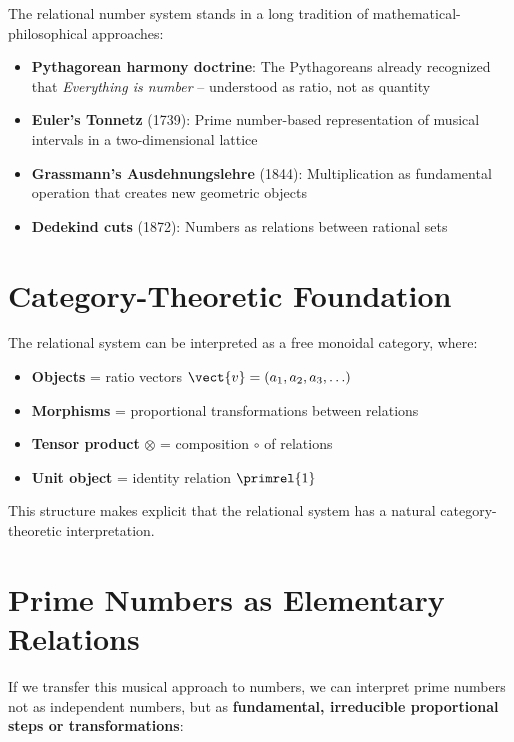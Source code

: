 	The relational number system stands in a long tradition of mathematical-philosophical approaches:
	
	\begin{itemize}
		\item \textbf{Pythagorean harmony doctrine}: The Pythagoreans already recognized that \emph{Everything is number} -- understood as ratio, not as quantity
		\item \textbf{Euler's Tonnetz} (1739): Prime number-based representation of musical intervals in a two-dimensional lattice
		\item \textbf{Grassmann's Ausdehnungslehre} (1844): Multiplication as fundamental operation that creates new geometric objects
		\item \textbf{Dedekind cuts} (1872): Numbers as relations between rational sets
	\end{itemize}
	
	\section{Category-Theoretic Foundation}
	
	\begin{category}
		The relational system can be interpreted as a free monoidal category, where:
		\begin{itemize}
			\item \textbf{Objects} = ratio vectors $\vect{v} = (a_1, a_2, a_3, \ldots)$
			\item \textbf{Morphisms} = proportional transformations between relations
			\item \textbf{Tensor product} $\otimes$ = composition $\circ$ of relations
			\item \textbf{Unit object} = identity relation $\primrel{1}$
		\end{itemize}
		
		This structure makes explicit that the relational system has a natural category-theoretic interpretation.
	\end{category}
	
	\section{Prime Numbers as Elementary Relations}
	
	If we transfer this musical approach to numbers, we can interpret prime numbers not as independent numbers, but as \textbf{fundamental, irreducible proportional steps or transformations}:
	
